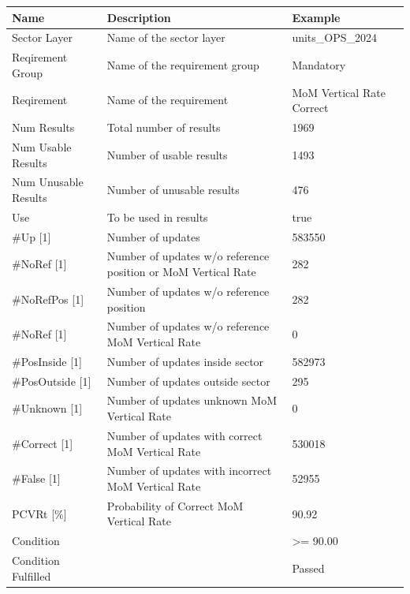 \begin{center}
 \begin{table}[H]
  \begin{tabularx}{\textwidth}{ | l | X |  l | }
    \hline
    \textbf{Name} & \textbf{Description} & \textbf{Example} \\ \hline
    Sector Layer & Name of the sector layer & units\_OPS\_2024 \\ \hline
    Reqirement Group & Name of the requirement group & Mandatory \\ \hline
    Reqirement & Name of the requirement & MoM Vertical Rate Correct \\ \hline
    Num Results & Total number of results & 1969 \\ \hline
    Num Usable Results & Number of usable results & 1493 \\ \hline
    Num Unusable Results & Number of unusable results & 476 \\ \hline
    Use & To be used in results & true \\ \hline
    \#Up [1] & Number of updates & 583550 \\ \hline
    \#NoRef [1] & Number of updates w/o reference position or MoM Vertical Rate & 282 \\ \hline
    \#NoRefPos [1] & Number of updates w/o reference position & 282 \\ \hline
    \#NoRef [1] & Number of updates w/o reference MoM Vertical Rate & 0 \\ \hline
    \#PosInside [1] & Number of updates inside sector & 582973 \\ \hline
    \#PosOutside [1] & Number of updates outside sector & 295 \\ \hline
    \#Unknown [1] & Number of updates unknown MoM Vertical Rate & 0 \\ \hline
    \#Correct [1] & Number of updates with correct MoM Vertical Rate & 530018 \\ \hline
    \#False [1] & Number of updates with incorrect MoM Vertical Rate & 52955 \\ \hline
    PCVRt [\%] & Probability of Correct MoM Vertical Rate & 90.92 \\ \hline
    Condition &  & >= 90.00 \\ \hline
    Condition Fulfilled &  & Passed \\ \hline
\end{tabularx}
\end{table}
\end{center}

